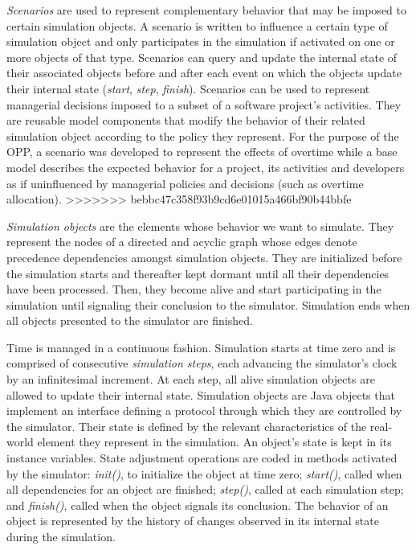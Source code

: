 \documentclass[conference]{IEEEtran}
\begin{document}
\textit{Scenarios} are used to represent complementary behavior that may be imposed to certain simulation objects. A scenario is written to influence a certain type of simulation object and only participates in the simulation if activated on one or more objects of that type. Scenarios can query and update the internal state of their associated objects before and after each event on which the objects update their internal state (\textit{start}, \textit{step}, \textit{finish}). Scenarios can be used to represent managerial decisions imposed to a subset of a software project's activities. They are reusable model components that modify the behavior of their related simulation object according to the policy they represent. For the purpose of the OPP, a scenario was developed to represent the effects of overtime while a base model describes the expected behavior for a project, its activities and developers as if uninfluenced by managerial policies and decisions (such as overtime allocation).
>>>>>>> bebbc47c358f93b9cd6e01015a466bf90b44bbfe

{\it Simulation objects} are the elements whose behavior we want to simulate. They represent the nodes of a directed and acyclic graph whose edges denote precedence dependencies amongst simulation objects. They are initialized before the simulation starts and thereafter kept dormant until all their dependencies have been processed. Then, they become alive and start participating in the simulation until signaling their conclusion to the simulator. Simulation ends when all objects presented to the simulator are finished.

Time is managed in a continuous fashion. Simulation starts at time zero and is comprised of consecutive {\it simulation steps}, each advancing the simulator's clock by an infinitesimal increment. At each step, all alive simulation objects are allowed to update their internal state. Simulation objects are Java objects that implement an interface defining a protocol through which they are controlled by the simulator. Their state is defined by the relevant characteristics of the real-world element they represent in the simulation. An object's state is kept in its instance variables. State adjustment operations are coded in methods activated by the simulator: {\it init()}, to initialize the object at time zero; {\it start()}, called when all dependencies for an object are finished; {\it step()}, called at each simulation step; and {\it finish()}, called when the object signals its conclusion. The behavior of an object is represented by the history of changes observed in its internal state during the simulation.
\end{document}
